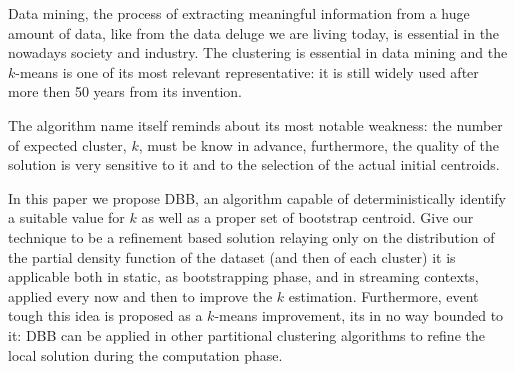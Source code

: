 Data mining, the process of extracting meaningful information from a huge amount of data,
like from the data deluge we are living today,
is essential in the nowadays society and industry.
The clustering is essential in data mining
and the $k$-means is one of its most relevant representative: it is still widely used after more then 50 years from its invention.


The algorithm name itself reminds about its most notable weakness: the number of expected cluster, $k$, must be know in advance,
furthermore, the quality of the solution is very sensitive to it and to the selection of the actual initial centroids.


In this paper we propose DBB, an algorithm capable of
deterministically identify a suitable value for $k$
as well as a proper set of bootstrap centroid.
Give our technique to be a refinement based solution relaying only on the distribution
of the partial density function of the dataset (and then of each cluster)
it is applicable both in static, as bootstrapping phase, and in streaming contexts,
applied every now and then to improve the $k$ estimation.
Furthermore, event tough this idea is proposed as a $k$-means improvement,
its in no way bounded to it: DBB can be applied in other partitional
clustering algorithms to refine the local solution during the computation phase.
